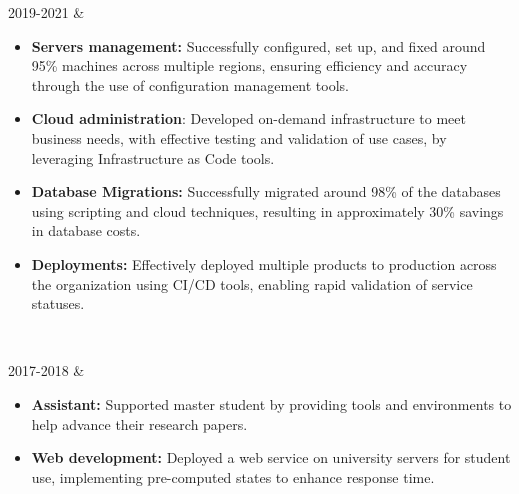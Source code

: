 \documentclass[
    changecolor={111, 156, 45}, 
]{cv-roald}
\begin{document}
\begin{tabularcv}
2019-2021    &  
        \begin{itemize}
            \item \textbf{Servers management:} Successfully configured, set up, and fixed around 95\% machines across multiple regions, ensuring efficiency and accuracy through the use of configuration management tools.
            \item \textbf{Cloud administration}: Developed on-demand infrastructure to meet business needs, with effective testing and validation of use cases, by leveraging Infrastructure as Code tools.
            \item \textbf{Database Migrations:} Successfully migrated around 98\% of the databases using scripting and cloud techniques, resulting in approximately 30\% savings in database costs.
            \item \textbf{Deployments:} Effectively deployed multiple products to production across the organization using CI/CD tools, enabling rapid validation of service statuses.
        \end{itemize}
                \
\end{tabularcv}

\begin{tabularcv}
2017-2018   &   
                \begin{itemize}
                \item \textbf{Assistant:} Supported master student by providing tools and environments to help advance their research papers.
                \item  \textbf{Web development:} Deployed a web service on university servers for student use, implementing pre-computed states to enhance response time.
                \end{itemize} 
\end{tabularcv} 
\end{document}
